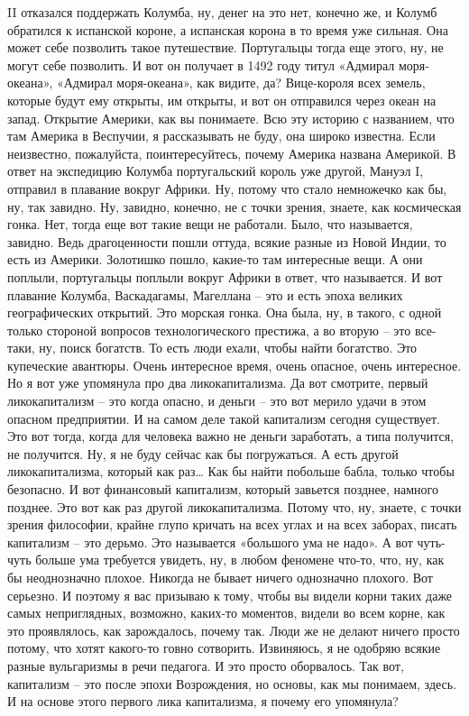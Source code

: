 II отказался поддержать Колумба, ну, денег на это нет, конечно же, и Колумб
обратился к испанской короне, а испанская корона в то время уже сильная. Она
может себе позволить такое путешествие. Португальцы тогда еще этого, ну, не
могут себе позволить. И вот он получает в 1492 году титул «Адмирал моря-океана»,
«Адмирал моря-океана», как видите, да? Вице-короля всех земель, которые будут
ему открыты, им открыты, и вот он отправился через океан на запад. Открытие
Америки, как вы понимаете. Всю эту историю с названием, что там Америка в
Веспучии, я рассказывать не буду, она широко известна. Если неизвестно,
пожалуйста, поинтересуйтесь, почему Америка названа Америкой. В ответ на
экспедицию Колумба португальский король уже другой, Мануэл I, отправил в
плавание вокруг Африки. Ну, потому что стало немножечко как бы, ну, так завидно.
Ну, завидно, конечно, не с точки зрения, знаете, как космическая гонка. Нет,
тогда еще вот такие вещи не работали. Было, что называется, завидно. Ведь
драгоценности пошли оттуда, всякие разные из Новой Индии, то есть из Америки.
Золотишко пошло, какие-то там интересные вещи. А они поплыли, португальцы
поплыли вокруг Африки в ответ, что называется. И вот плавание Колумба,
Васкадагамы, Магеллана – это и есть эпоха великих географических открытий. Это
морская гонка. Она была, ну, в такого, с одной только стороной вопросов
технологического престижа, а во вторую – это все-таки, ну, поиск богатств. То
есть люди ехали, чтобы найти богатство. Это купеческие авантюры. Очень
интересное время, очень опасное, очень интересное. Но я вот уже упомянула про
два ликокапитализма. Да вот смотрите, первый ликокапитализм – это когда опасно,
и деньги – это вот мерило удачи в этом опасном предприятии. И на самом деле
такой капитализм сегодня существует. Это вот тогда, когда для человека важно не
деньги заработать, а типа получится, не получится. Ну, я не буду сейчас как бы
погружаться. А есть другой ликокапитализма, который как раз… Как бы найти
побольше бабла, только чтобы безопасно. И вот финансовый капитализм, который
завьется позднее, намного позднее. Это вот как раз другой ликокапитализма.
Потому что, ну, знаете, с точки зрения философии, крайне глупо кричать на всех
углах и на всех заборах, писать капитализм – это дерьмо. Это называется
«большого ума не надо». А вот чуть-чуть больше ума требуется увидеть, ну, в
любом феномене что-то, что, ну, как бы неоднозначно плохое. Никогда не бывает
ничего однозначно плохого. Вот серьезно. И поэтому я вас призываю к тому, чтобы
вы видели корни таких даже самых неприглядных, возможно, каких-то моментов,
видели во всем корне, как это проявлялось, как зарождалось, почему так. Люди же
не делают ничего просто потому, что хотят какого-то говно сотворить. Извиняюсь,
я не одобряю всякие разные вульгаризмы в речи педагога. И это просто оборвалось.
Так вот, капитализм – это после эпохи Возрождения, но основы, как мы понимаем,
здесь. И на основе этого первого лика капитализма, я почему его упомянула?


